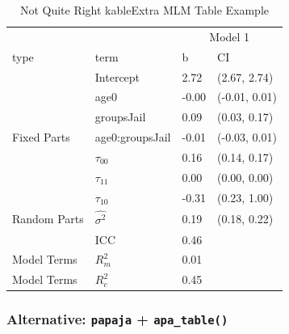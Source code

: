 \documentclass[]{article}
\newenvironment{Shaded}{\begin{snugshade}}{\end{snugshade}}
\newcommand{\KeywordTok}[1]{\textcolor[rgb]{0.13,0.29,0.53}{\textbf{#1}}}
\newcommand{\DataTypeTok}[1]{\textcolor[rgb]{0.13,0.29,0.53}{#1}}
\newcommand{\DecValTok}[1]{\textcolor[rgb]{0.00,0.00,0.81}{#1}}
\newcommand{\StringTok}[1]{\textcolor[rgb]{0.31,0.60,0.02}{#1}}
\newcommand{\OperatorTok}[1]{\textcolor[rgb]{0.81,0.36,0.00}{\textbf{#1}}}
\newcommand{\NormalTok}[1]{#1}
\begin{document}
\begin{table}

\caption{\label{tab:unnamed-chunk-27}Not Quite Right kableExtra MLM Table Example}
\centering
\begin{tabular}[t]{llll}
\toprule
\multicolumn{1}{c}{ } & \multicolumn{1}{c}{ } & \multicolumn{2}{c}{Model 1} \\
\cmidrule(l{2pt}r{2pt}){3-4}
type & term & b & CI\\
\midrule
 & Intercept & 2.72 & (2.67, 2.74)\\
\cmidrule{2-4}
 & age0 & -0.00 & (-0.01, 0.01)\\
\cmidrule{2-4}
 & groupsJail & 0.09 & (0.03, 0.17)\\
\cmidrule{2-4}
\multirow{-4}{*}{\raggedright\arraybackslash Fixed Parts} & age0:groupsJail & -0.01 & (-0.03, 0.01)\\
\cmidrule{1-4}
 & $\tau_{00}$ & 0.16 & (0.14, 0.17)\\
\cmidrule{2-4}
 & $\tau_{11}$ & 0.00 & (0.00, 0.00)\\
\cmidrule{2-4}
 & $\tau_{10}$ & -0.31 & (0.23, 1.00)\\
\cmidrule{2-4}
Random Parts & $\hat{\sigma^2}$ & 0.19 & (0.18, 0.22)\\
 & ICC & 0.46 & \\
\cmidrule{2-4}
Model Terms & $R^2_m$ & 0.01 & \\
Model Terms & $R^2_c$ & 0.45 & \\
\bottomrule
\end{tabular}
\end{table}

\subsubsection{\texorpdfstring{Alternative: \texttt{papaja} +
\texttt{apa\_table()}}{Alternative: papaja + apa\_table()}}\label{alternative-papaja-apa_table}

\small

\begin{Shaded}
\end{Shaded}
\end{document}
